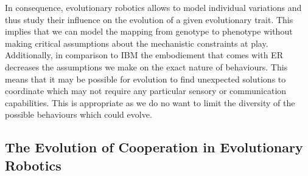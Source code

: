         In consequence, evolutionary robotics allows to model individual variations and thus study their influence on the evolution of a given evolutionary trait. This implies that we can model the mapping from genotype to phenotype without making critical assumptions about the mechanistic constraints at play. Additionally, in comparison to IBM the embodiement that comes with ER decreases the assumptions we make on the exact nature of behaviours. This means that it may be possible for evolution to find unexpected solutions to coordinate which may not require any particular sensory or communication capabilities. This is appropriate as we do no want to limit the diversity of the possible behaviours which could evolve.



    \subsection{The Evolution of Cooperation in Evolutionary Robotics}


